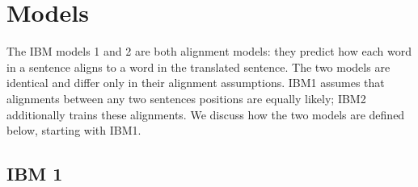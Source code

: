 \documentclass[11pt,a4paper]{article}
\begin{document}

\section{Models} 

The IBM models 1 and 2 are both alignment models: they predict how each word in a sentence aligns to a word in the translated sentence. The two models are identical and differ only in their alignment assumptions. IBM1 assumes that alignments between any two sentences positions are equally likely; IBM2 additionally trains these alignments. We discuss how the two models are defined below, starting with IBM1.

\subsection{IBM 1}
\end{document}
